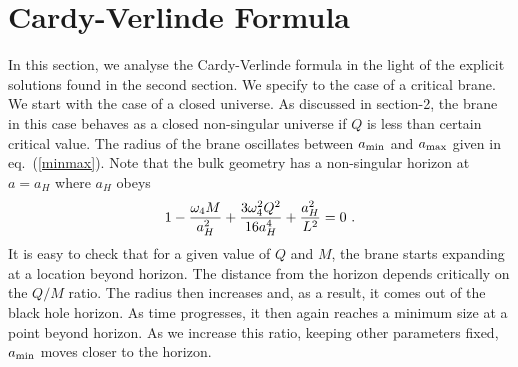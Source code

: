 \documentclass[a4paper,11pt]{article}
\begin{document}
\section{Cardy-Verlinde Formula\label{CVF}}

In this section, we analyse the Cardy-Verlinde formula  \cite{EV,SV} in 
the light of the explicit solutions found in the second section. We
specify to the case of a critical brane. We start with the case of a
closed universe. As discussed in section-2, the brane in this case 
behaves as a closed non-singular universe if $Q$ is less than certain 
critical value. The radius of the brane oscillates between  $a_{\rm min}$
and $a_{\rm max}$ given in eq.~(\ref{minmax}). Note that the bulk geometry
has a  non-singular horizon at $a = a_H$ where $a_H$ obeys
%
\begin{equation}
1 - {\omega_{4} M\over{a_H^{2}}} + {3 \omega_{4}^2 Q^2
\over {16 a_H^{4}}} + {a_H^2\over{L^2}} =0 \,\,.
\label{horiloc}
\end{equation}
%
It is easy to check that for a given 
value of $Q$ and $M$, the brane starts expanding at a location beyond
horizon. The distance from the horizon depends critically on the 
$Q/M$ ratio. The radius then increases and, as a result, it comes out 
of the black hole horizon. As time progresses, it then again reaches a 
minimum size 
at a point beyond horizon. 
As we increase this ratio, keeping other 
parameters fixed, $a_{\rm min}$ moves closer to the horizon.
\end{document}
